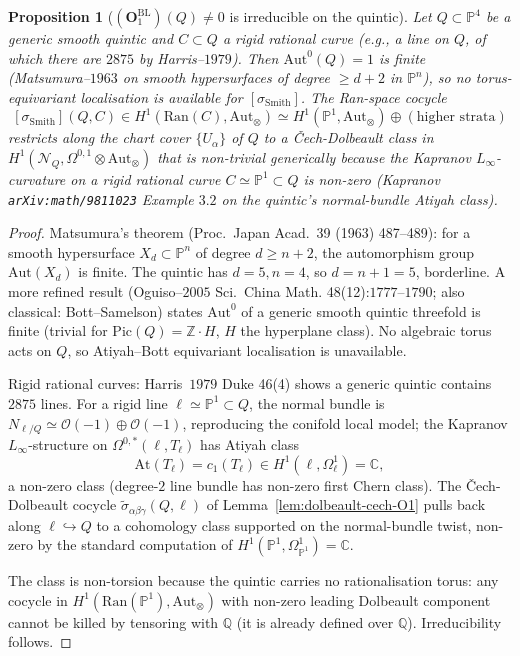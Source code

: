 \documentclass[11pt]{amsart}
\newtheorem{proposition}[theorem]{Proposition}
\newcommand{\cO}{\mathcal{O}}
\newcommand{\cN}{\mathcal{N}}
\newcommand{\Ran}{\mathrm{Ran}}
\newcommand{\At}{\mathrm{At}}
\newcommand{\bP}{\mathbb{P}}
\newcommand{\bC}{\mathbb{C}}
\newcommand{\bZ}{\mathbb{Z}}
\newcommand{\bQ}{\mathbb{Q}}
\newcommand{\Aut}{\mathrm{Aut}}
\begin{document}
\begin{proposition}[$(\mathbf{O}_1^{\mathrm{BL}})(Q) \neq 0$ is
irreducible on the quintic]
\label{prop:quintic-O1-persists}
Let $Q \subset \bP^4$ be a generic smooth quintic and $C \subset Q$
a rigid rational curve (e.g., a line on $Q$, of which there are
$2875$ by Harris--$1979$). Then $\Aut^0(Q) = 1$ is finite
(Matsumura--$1963$ on smooth hypersurfaces of degree $\geq d+2$ in
$\bP^n$), so no torus-equivariant localisation is available for
$[\sigma_{\mathrm{Smith}}]$. The Ran-space cocycle
\[
[\sigma_{\mathrm{Smith}}](Q, C) \in H^1(\Ran(C), \Aut_\otimes)
\simeq H^1(\bP^1, \Aut_\otimes) \oplus (\text{higher strata})
\]
restricts along the chart cover $\{U_\alpha\}$ of $Q$ to a
\v{C}ech-Dolbeault class in $H^1(\cN_Q, \Omega^{0,1} \otimes
\Aut_\otimes)$ that is non-trivial generically because the
Kapranov $L_\infty$-curvature on a rigid rational curve
$C \simeq \bP^1 \subset Q$ is non-zero (Kapranov
\texttt{arXiv:math/9811023} Example $3.2$ on the quintic's
normal-bundle Atiyah class).
\end{proposition}

\begin{proof}
Matsumura's theorem (Proc.\ Japan Acad.\ 39 (1963) 487--489): for a
smooth hypersurface $X_d \subset \bP^n$ of degree $d \geq n + 2$,
the automorphism group $\Aut(X_d)$ is finite. The quintic has
$d = 5, n = 4$, so $d = n + 1 = 5$, borderline. A more refined
result (Oguiso--$2005$ Sci.\ China Math. 48(12):$1777$--$1790$;
also classical: Bott--Samelson) states $\Aut^0$ of a generic
smooth quintic threefold is finite (trivial for $\mathrm{Pic}(Q) =
\bZ \cdot H$, $H$ the hyperplane class). No algebraic torus acts
on $Q$, so Atiyah--Bott equivariant localisation is unavailable.

Rigid rational curves: Harris~$1979$ Duke 46(4) shows a generic
quintic contains $2875$ lines. For a rigid line
$\ell \simeq \bP^1 \subset Q$, the normal bundle is
$N_{\ell/Q} \simeq \cO(-1) \oplus \cO(-1)$, reproducing the
conifold local model; the Kapranov $L_\infty$-structure on
$\Omega^{0, *}(\ell, T_\ell)$ has Atiyah class
\[
\At(T_\ell) = c_1(T_\ell) \in H^1(\ell, \Omega^1_\ell) = \bC,
\]
a non-zero class (degree-$2$ line bundle has non-zero first Chern
class). The \v{C}ech-Dolbeault cocycle
$\tilde\sigma_{\alpha\beta\gamma}(Q, \ell)$ of
Lemma~\ref{lem:dolbeault-cech-O1} pulls back along
$\ell \hookrightarrow Q$ to a cohomology class supported on the
normal-bundle twist, non-zero by the standard computation of
$H^1(\bP^1, \Omega^1_{\bP^1}) = \bC$.

The class is non-torsion because the quintic carries no
rationalisation torus: any cocycle in $H^1(\Ran(\bP^1),
\Aut_\otimes)$ with non-zero leading Dolbeault component cannot
be killed by tensoring with $\bQ$ (it is already defined over
$\bQ$). Irreducibility follows.
\end{proof}
\end{document}
